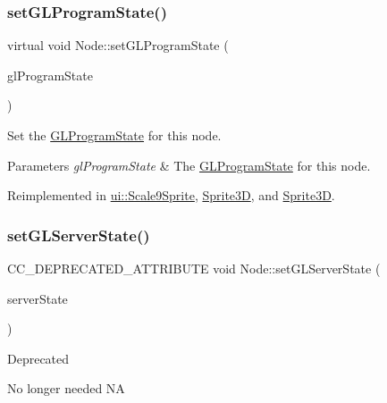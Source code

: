 \subsubsection{\texorpdfstring{set\+G\+L\+Program\+State()}{setGLProgramState()}\hspace{0.1cm}{\footnotesize\ttfamily [2/2]}}
{\footnotesize\ttfamily virtual void Node\+::set\+G\+L\+Program\+State (\begin{DoxyParamCaption}\item[{\hyperlink{classGLProgramState}{G\+L\+Program\+State} $\ast$}]{gl\+Program\+State }\end{DoxyParamCaption})\hspace{0.3cm}{\ttfamily [virtual]}}

Set the \hyperlink{classGLProgramState}{G\+L\+Program\+State} for this node.


\begin{DoxyParams}{Parameters}
{\em gl\+Program\+State} & The \hyperlink{classGLProgramState}{G\+L\+Program\+State} for this node. \\
\hline
\end{DoxyParams}


Reimplemented in \hyperlink{classui_1_1Scale9Sprite_ac5d1aa898d17b1417f8d6ac5589d0440}{ui\+::\+Scale9\+Sprite}, \hyperlink{classSprite3D_a8bfa814ae2f4584b69dbb776de1c327b}{Sprite3D}, and \hyperlink{classSprite3D_ab9e57d29350dc6886360d433c023b935}{Sprite3D}.

\mbox{\label{classNode_ad218be5dafbfc529444c1e619841260e}} 
\subsubsection{\texorpdfstring{set\+G\+L\+Server\+State()}{setGLServerState()}\hspace{0.1cm}{\footnotesize\ttfamily [1/2]}}
{\footnotesize\ttfamily C\+C\+\_\+\+D\+E\+P\+R\+E\+C\+A\+T\+E\+D\+\_\+\+A\+T\+T\+R\+I\+B\+U\+TE void Node\+::set\+G\+L\+Server\+State (\begin{DoxyParamCaption}\item[{int}]{server\+State }\end{DoxyParamCaption})\hspace{0.3cm}{\ttfamily [inline]}}

\begin{DoxyRefDesc}{Deprecated}
\item[\hyperlink{deprecated__deprecated000029}{Deprecated}]No longer needed  NA \end{DoxyRefDesc}
\mbox{\label{classNode_a5eb3c79871dc219ae8345fc72c7a00de}} 
